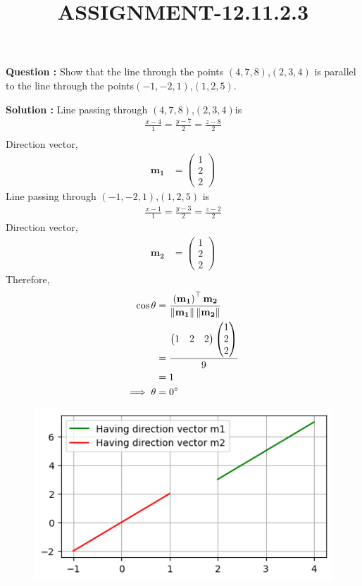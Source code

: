 \documentclass[12pt]{article}
\providecommand{\brak}[1]{\ensuremath{\left(#1\right)}}
\providecommand{\myvec}[1]{\ensuremath{\begin{pmatrix}#1\end{pmatrix}}}
\newcommand\norm[1]{\left\Vert#1\right\Vert}
\let\vec\mathbf
\begin{document}
\title{\textbf{ASSIGNMENT-12.11.2.3}}
\date{}
\maketitle
\textbf{Question :} Show that the line through the points \brak{4,7,8},\brak{2,3,4} is parallel to the line through the points\brak{-1,-2,1},\brak{1,2,5}.

\textbf{Solution :}
Line passing through \brak{4,7,8},\brak{2,3,4}is
\begin{align}
\frac{x-4}{1}=\frac{y-7}{2}=\frac{z-8}{2}\\
\end{align}
Direction vector,\begin{align}
    \vec{m_1}&=\myvec{1\\2\\2}
\end{align}
Line passing through \brak{-1,-2,1},\brak{1,2,5} is
\begin{align}
\frac{x-1}{1}=\frac{y-3}{2}=\frac{z-2}{2}
    \end{align}
Direction vector,\begin{align}
    \vec{m_2}&=\myvec{1\\2\\2}
\end{align}
Therefore,
\begin{align}
    \cos{\theta}&=\frac{\brak{\vec{m_1}}^{\top}\vec{m_2}}{\vec{\norm{m_1}\norm{m_2}}}\\
    &=\frac{\myvec{1&2&2}\myvec{1\\2\\2}}{9}\\
    &=1\\
    \implies \theta &= 0\degree
    \end{align}
\begin{figure}
    \centering
    \includegraphics[width=\columnwidth]{fig/12.11.2.3.png}
    \caption{}
    \label{12.11.2.3}
\end{figure}
\end{document}
